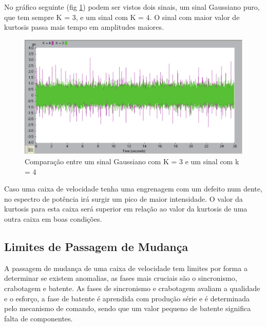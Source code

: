 No gráfico seguinte (fig \ref{kurtosis1}) podem ser vistos dois sinais, um sinal Gaussiano puro, que tem sempre K = 3, e um sinal com K = 4. O sinal com maior valor de kurtosis passa mais tempo em amplitudes maiores.


\begin{figure}[H]
\centering
\includegraphics[scale=0.3]{figs/Kurtosis1}
\caption{Comparação entre um sinal Gaussiano com K = 3 e um sinal com k = 4 }\label{kurtosis1}
\end{figure}

Caso uma caixa de velocidade tenha uma engrenagem com um defeito num dente, no espectro de potência irá surgir um pico de maior intensidade. O valor da kurtosis para esta caixa será superior em relação ao valor da kurtosis de uma outra caixa em boas condições.




\subsection{Limites de Passagem de Mudança}

A passagem de mudança de uma caixa de velocidade tem limites por forma a determinar se existem anomalias, as fases mais cruciais são o sincronismo, crabotagem e batente. As fases de sincronismo e crabotagem avaliam a qualidade e o esforço, a fase de batente é aprendida com produção série e é determinada pelo mecanismo de comando, sendo que um valor pequeno de batente significa falta de componentes.




